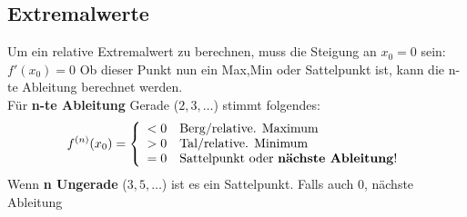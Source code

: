 \subsection{Extremalwerte}
Um ein relative Extremalwert zu berechnen, muss die Steigung an $x_0 = 0$ sein:
$ f'(x_0) = 0 $ 
\noindent
Ob dieser Punkt nun ein Max,Min oder Sattelpunkt ist, kann die n-te Ableitung berechnet werden. \\Für \textbf{n-te Ableitung} Gerade ($2,3,\dots$) stimmt folgendes:
\[f^{(n)}(x_0) = \left\lbrace   \begin{array}{r@{}l}
	< 0 &\quad \text{Berg/relative. Maximum} \\
	> 0 &\quad \text{Tal/relative. Minimum} \\
	= 0 &\quad \text{Sattelpunkt oder \textbf{nächste Ableitung}!}
\end{array}\right.
\]
Wenn \textbf{n Ungerade} ($3, 5, \dots$) ist es ein Sattelpunkt. Falls auch $0$, nächste Ableitung


